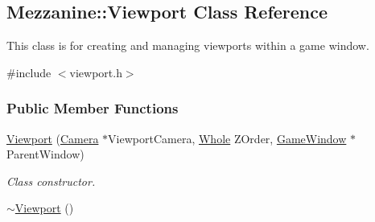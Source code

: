 \hypertarget{classMezzanine_1_1Viewport}{
\subsection{Mezzanine::Viewport Class Reference}
\label{classMezzanine_1_1Viewport}
}


This class is for creating and managing viewports within a game window.  




{\ttfamily \#include $<$viewport.h$>$}

\subsubsection*{Public Member Functions}
\begin{DoxyCompactItemize}
\item 
\hyperlink{classMezzanine_1_1Viewport_a6bcb912b24cb7d4e0fa4085bf360e997}{Viewport} (\hyperlink{classMezzanine_1_1Camera}{Camera} $\ast$ViewportCamera, \hyperlink{namespaceMezzanine_adcbb6ce6d1eb4379d109e51171e2e493}{Whole} ZOrder, \hyperlink{classMezzanine_1_1GameWindow}{GameWindow} $\ast$ParentWindow)
\begin{DoxyCompactList}\small\item\em Class constructor. \item\end{DoxyCompactList}\item 
\hypertarget{classMezzanine_1_1Viewport_a70b5324edd95ce30cceddf23be31e60c}{
\hyperlink{classMezzanine_1_1Viewport_a70b5324edd95ce30cceddf23be31e60c}{$\sim$Viewport} ()}
\label{classMezzanine_1_1Viewport_a70b5324edd95ce30cceddf23be31e60c}


\end{DoxyCompactItemize}
